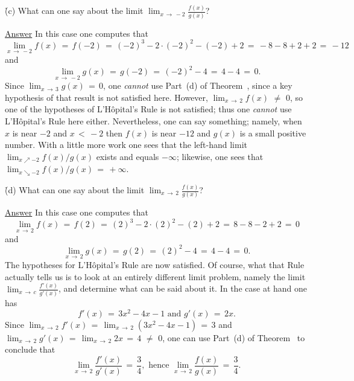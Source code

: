 {        \h (c) What can one say about the limit ${\displaystyle \lim_{x \,{\rightarrow}\,-2}\frac{f(x)}{g(x)}}$?

        \underline{Answer} In this case one computes that
        \begin{displaymath}
        \lim_{x \,{\rightarrow}\,-2} f(x) \,=\, f(-2) \,=\, (-2)^{3}-2{\cdot}(-2)^{2}-(-2)+2 \,=\, -8-8+2+2 \,=\, -12
        \end{displaymath}
    and
        \begin{displaymath}
        \lim_{x \,{\rightarrow}\,-2} g(x) \,=\, g(-2) \,=\, (-2)^{2}-4 \,=\, 4-4 \,=\, 0.
        \end{displaymath}
    Since $\lim_{x \,{\rightarrow}\, 3} g(x) \,=\, 0$, one {\em cannot} use Part~(d) of Theorem~, since a key hypothesis of that result is not satisfied here.
    However, $\lim_{x \,{\rightarrow}\, 2} f(x) \,\,{\neq}\,\, 0$, so one of the hypotheses of L'H\^{o}pital's Rule is not satisfied;
    thus one {\em cannot} use L'H\^{o}pital's Rule here either.
    Nevertheless, one can say something; namely, when $x$ is near $-2$ and $x\,<\,-2$ then $f(x)$ is near $-12$ and $g(x)$ is a small positive number.
    With a little more work one sees that the left-hand limit $\lim_{x{\nearrow}-2} f(x)/g(x)$ exists and equals $-{\infty}$;
    likewise, one sees that  $\lim_{x{\searrow}-2} f(x)/g(x) \,=\, +{\infty}$.

\V

        \h (d) What can one say about the limit ${\displaystyle \lim_{x \,{\rightarrow}\,2}\frac{f(x)}{g(x)}}$?

        \underline{Answer} In this case one computes that
        \begin{displaymath}
        \lim_{x \,{\rightarrow}\,2} f(x) \,=\, f(2) \,=\, (2)^{3}-2{\cdot}(2)^{2}-(2)+2 \,=\, 8-8-2+2 \,=\, 0
        \end{displaymath}
    and
        \begin{displaymath}
        \lim_{x \,{\rightarrow}\,2} g(x) \,=\, g(2) \,=\, (2)^{2}-4 \,=\, 4-4 \,=\, 0.
        \end{displaymath}
    The hypotheses for L'H\^{o}pital's Rule are now satisfied. Of course, what that Rule actually tells us is to look at an entirely different limit problem, 
    namely the limit ${\displaystyle \lim_{x \,{\rightarrow}\, c} \frac{f'(x)}{g'(x)}}$,
    and determine what can be said about it. In the case at hand one has
        \begin{displaymath}
        f'(x) \,=\, 3x^{2}-4x-1 \mbox{ and } g'(x) \,=\, 2x.
        \end{displaymath}
    Since $\lim_{x \,{\rightarrow}\, 2} f'(x) \,=\, \lim_{x \,{\rightarrow}\, 2} (3x^{2}-4x-1) \,=\, 3$ and $\lim_{x \,{\rightarrow}\, 2} g'(x) \,=\, \lim_{x \,{\rightarrow}\, 2} 2x \,=\, 4 \,\,{\neq}\,\, 0$, one can use Part~(d) of Theorem~ to conclude that
        \begin{displaymath}
        \lim_{x \,{\rightarrow}\, 2} \frac{f'(x)}{g'(x)} \,=\, \frac{3}{4}, \mbox{ hence } \lim_{x \,{\rightarrow}\, 2} \frac{f(x)}{g(x)} \,=\, \frac{3}{4}.
        \end{displaymath}

}
